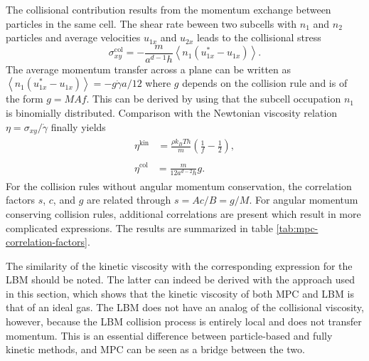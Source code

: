 \documentclass[8.5pt,twoside,twocolumn]{article}
\begin{document}
The collisional contribution results from the momentum exchange between particles in the same cell. The shear rate beween two subcells with $n_1$ and $n_2$ particles and average velocities $u_{1x}$ and $u_{2x}$ leads to the collisional stress
%
%
%
\begin{equation}
\sigma^\text{col}_{xy} = - \frac{m}{a^{d-1} h} \left\langle n_1 \left( u_{1x}^* - u_{1x} \right) \right\rangle .
\end{equation}
%
The average momentum transfer across a plane can be written as $\left\langle n_1 \left( u_{1x}^* - u_{1x} \right) \right\rangle = - g \dot{\gamma} a/12$ where $g$ depends on the collision rule and is of the form $g=MAf$. This can be derived by using that the subcell occupation $n_1$ is binomially distributed.\cite{Kikuchi:2003} Comparison with the Newtonian viscosity relation $\eta=\sigma_{xy}/\dot{\gamma}$ finally yields
%
\begin{align}
  \begin{split}
    \eta^\text{kin} &= \frac{\rho k_BT h}{m} \left( \frac{1}{f} - \frac{1}{2} \right) ,
  \end{split}\\
  \begin{split}
  \eta^\text{col} &= \frac{m}{12 a^{d-2} h} g .
  \end{split}
\end{align}
%
For the collision rules without angular momentum conservation, the correlation factors $s$, $c$, and $g$ are related through $s = Ac/B = g/M$. For angular momentum conserving collision rules, additional correlations are present which result in more complicated expressions. The results are summarized in table \ref{tab:mpc-correlation-factors}.

The similarity of the kinetic viscosity with the corresponding expression for the LBM should be noted. The latter can indeed be derived with the approach used in this section, which shows that the kinetic viscosity of both MPC and LBM is that of an ideal gas. The LBM does not have an analog of the collisional viscosity, however, because the LBM collision process is entirely local and does not transfer momentum. This is an essential difference between particle-based and fully kinetic methods, and MPC can be seen as a bridge between the two.
\end{document}
